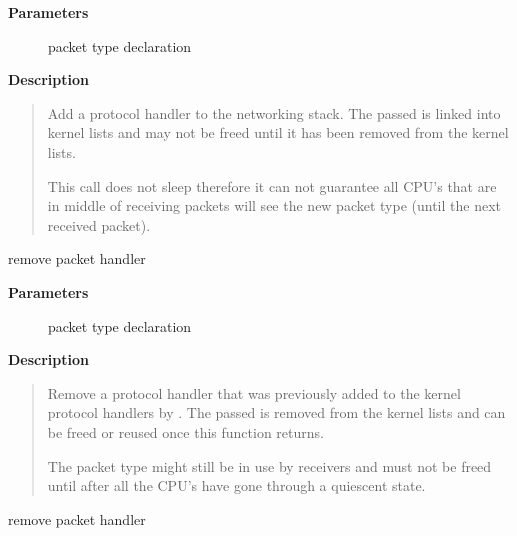 \documentclass[a4paper,8pt,english]{sphinxmanual}
\begin{document}
\textbf{Parameters}
\begin{description}
\item[{}] \leavevmode
packet type declaration

\end{description}

\textbf{Description}
\begin{quote}

Add a protocol handler to the networking stack. The passed 
is linked into kernel lists and may not be freed until it has been
removed from the kernel lists.

This call does not sleep therefore it can not
guarantee all CPU's that are in middle of receiving packets
will see the new packet type (until the next received packet).
\end{quote}

\begin{fulllineitems}
\label{networking/kapi:c.__dev_remove_pack}
remove packet handler

\end{fulllineitems}


\textbf{Parameters}
\begin{description}
\item[{}] \leavevmode
packet type declaration

\end{description}

\textbf{Description}
\begin{quote}

Remove a protocol handler that was previously added to the kernel
protocol handlers by {\hyperref[networking/kapi:c.dev_add_pack]{\emph{}}}. The passed  is removed
from the kernel lists and can be freed or reused once this function
returns.

The packet type might still be in use by receivers
and must not be freed until after all the CPU's have gone
through a quiescent state.
\end{quote}

\begin{fulllineitems}
\label{networking/kapi:c.dev_remove_pack}
remove packet handler

\end{fulllineitems}
\end{document}
